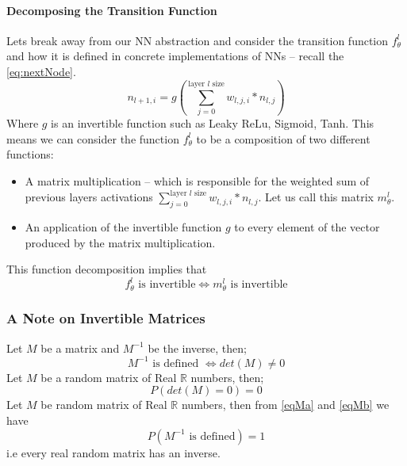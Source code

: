 \documentclass[dissertation.tex]{subfiles}
\begin{document}
\paragraph{Decomposing the Transition Function}
Lets break away from our NN abstraction and consider the transition function
$f_\theta^l$ and how it is defined in concrete implementations of NNs -- recall
the \autoref{eq:nextNode}.
\begin{equation*}
  n_{l+1,i} = g(\sum_{j = 0}^{\text{layer }l\text{ size}} w_{l,j,i}*n_{l,j})
\end{equation*}
Where $g$ is an invertible function such as Leaky ReLu, Sigmoid, Tanh.
This means we can consider the function $f_\theta^l$ to be a composition
of two different functions:
\begin{itemize}
  \item{
      A matrix multiplication -- which is responsible for the
      weighted sum of previous layers activations $\sum_{j = 0}^{\text{layer
      }l\text{ size}} w_{l,j,i}*n_{l,j}$. Let us call this matrix $m_\theta^l$.
    }
  \item{
      An application of the invertible function $g$ to every element of
      the vector produced by the matrix multiplication.
    }
\end{itemize}
This function decomposition implies that 
\begin{equation}
  f_\theta^l \text{ is invertible} 
  \Leftrightarrow 
  m_\theta^l \text{ is invertible} 
\end{equation}
    
\subsubsection{A Note on Invertible Matrices}

Let $M$ be a matrix and $M^{-1}$ be the inverse, then;
\begin{equation}
  M^{-1} \text{ is defined }
  \Leftrightarrow 
  det(M) \neq 0
  \label{eqMa}
\end{equation}
Let $M$ be a random matrix of Real $\mathbb{R}$ numbers, then;
\begin{equation}
  P(det(M)=0)=0
  \label{eqMb}
\end{equation}
Let $M$ be random matrix of Real $\mathbb{R}$ numbers, then from \autoref{eqMa}
and \autoref{eqMb} we have
\begin{equation}
  P(M^{-1} \text{ is defined}) = 1 
  \label{eqMc}
\end{equation}
i.e every real random matrix has an inverse.
\end{document}
